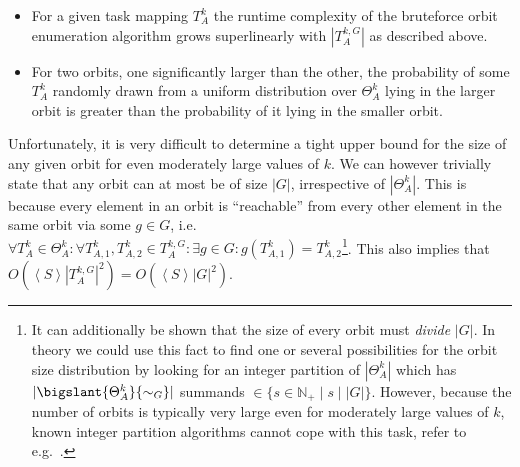 \begin{itemize}
\item For a given task mapping $T_{A}^k$ the runtime complexity of the
bruteforce orbit enumeration algorithm grows superlinearly with
$|T_{A}^{k,G}|$ as described above.

\item For two orbits, one significantly larger than the other, the probability
of some $T_A^k$ randomly drawn from a uniform distribution over $\Theta_A^k$
lying in the larger orbit is greater than the probability of it lying in the
smaller orbit.
\end{itemize}

\noindent
Unfortunately, it is very difficult to determine a tight upper bound for the
size of any given orbit for even moderately large values of $k$. We can however
trivially state that any orbit can at most be of size $|G|$, irrespective of
$|\Theta_A^k|$. This is because every element in an orbit is ``reachable'' from
every other element in the same orbit via some $g \in G$, i.e. $\forall T_A^k
\in \Theta_A^k: \forall T_{A,1}^k, T_{A,2}^k \in T_A^{k,G}: \exists g \in G:
g(T_{A,1}^k) = T_{A,2}^k$\footnote{It can additionally be shown that the size
of every orbit must \textit{divide} $|G|$. In theory we could use this fact to
find one or several possibilities for the orbit size distribution by looking
for an integer partition of $|\Theta_A^k|$ which has
$|\bigslant{\Theta_A^k}{\sim_G}|$ summands $\in \{s \in \mathbb{N}_+ \mid s
\mid |G|\}$.  However, because the number of orbits is typically very large
even for moderately large values of $k$, known integer partition algorithms
cannot cope with this task, refer to e.g.~\cite{Zoghbi}.}. This also implies that
$O(\left<S\right> |T_A^{k,G}|^2) = O(\left<S\right> |G|^2)$.


